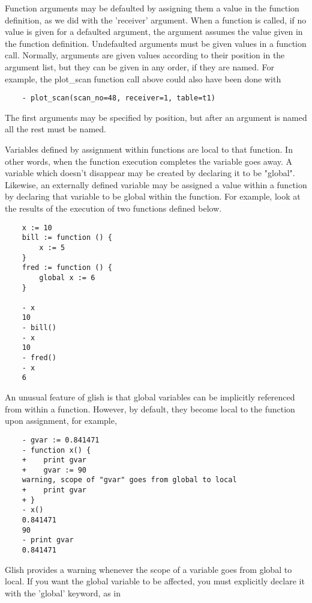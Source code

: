     Function arguments may be defaulted by assigning them a value in the
function definition, as we did with the 'receiver' argument.  When a
function is called, if no value is given for a defaulted argument, the
argument assumes the value given in the function definition.  Undefaulted
arguments must be given values in a function call.  Normally, arguments are
given values according to their position in the argument list, but they can
be given in any order, if they are named.  For example, the plot\_scan
function call above could also have been done with

\begin{verbatim}
	- plot_scan(scan_no=48, receiver=1, table=t1)
\end{verbatim}

The first arguments may be specified by position, but after an argument is
named all the rest must be named.

    Variables defined by assignment within functions are local to that
function.  In other words, when the function execution completes the
variable goes away.  A variable which doesn't disappear may be created by
declaring it to be "global".  Likewise, an externally defined variable may
be assigned a value within a function by declaring that variable to be
global within the function.  For example, look at the results of the
execution of two functions defined below.

\begin{verbatim}
	x := 10
	bill := function () {
	    x := 5
	}
	fred := function () {
	    global x := 6
	}

	- x
	10
	- bill()
	- x
	10
	- fred()
	- x
	6
\end{verbatim}

An unusual feature of glish is that global variables can be implicitly
referenced from within a function. However, by default, they become local
to the function upon assignment, for example,

\begin{verbatim}
	- gvar := 0.841471
	- function x() {
	+    print gvar
	+    gvar := 90
	warning, scope of "gvar" goes from global to local
	+    print gvar
	+ }
	- x()   
	0.841471
	90
	- print gvar
	0.841471
\end{verbatim}

Glish provides a warning whenever the scope of a variable goes from global
to local.  If you want the global variable to be affected, you must
explicitly declare it with the 'global' keyword, as in

